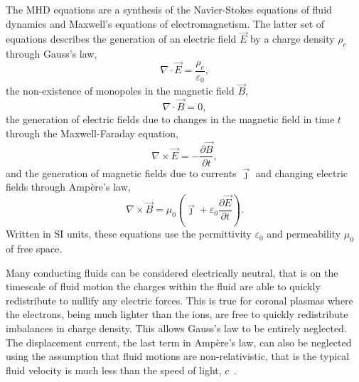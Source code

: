 The MHD equations are a synthesis of the Navier-Stokes equations of fluid dynamics and Maxwell's equations of electromagnetism. The latter set of equations describes the generation of an electric field $\vec{E}$ by a charge density $\rho_c$ through Gauss's law,
\begin{equation}
  \label{eq:gauss_law}
 \nabla \cdot \vec {E} ={\frac {\rho_c }{\varepsilon _{0}}},
\end{equation}
the non-existence of monopoles in the magnetic field $\vec{B}$,
\begin{equation}
  \label{eq:gauss_law_for_magnetism}
  \nabla \cdot \vec {B} =0,
\end{equation}
the generation of electric fields due to changes in the magnetic field in time $t$ through the Maxwell-Faraday equation,
\begin{equation}
  \label{eq:maxwell_faraday}
 \nabla \times \vec {E} =-{\frac {\partial \vec {B} }{\partial t}},
\end{equation}
and the generation of magnetic fields due to currents $\vec{\jmath}$ and changing electric fields through Ampère's law,
\begin{equation}
  \label{eq:ampere_law}
 \nabla \times \vec {B} =\mu _{0}\left(\vec {\jmath} +\varepsilon _{0}{\frac {\partial \vec {E} }{\partial t}}\right).
\end{equation}
Written in SI units, these equations use the permittivity $\varepsilon_{0}$ and permeability $\mu_0$ of free space.

Many conducting fluids can be considered electrically neutral, that is on the timescale of fluid motion the charges within the fluid are able to quickly redistribute to nullify any electric forces. This is true for coronal plasmas where the electrons, being much lighter than the ions, are free to quickly redistribute imbalances in charge density. This allows Gauss's law to be entirely neglected. The displacement current, the last term in Ampère's law, can also be neglected using the assumption that fluid motions are non-relativistic, that is the typical fluid velocity is much less than the speed of light, $c$~\cite{priestMagnetohydrodynamicsSuna}.


